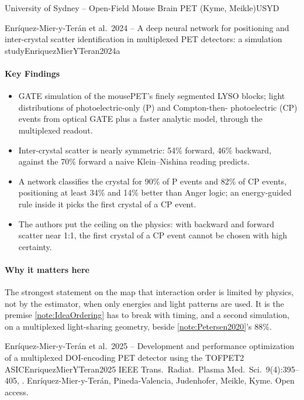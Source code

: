 \begin{programnote}{University of Sydney -- Open-Field Mouse Brain PET (Kyme, Meikle)}{USYD}
\begin{papernote}{Enríquez-Mier-y-Terán et al.\ 2024 -- A deep neural network for positioning and inter-crystal scatter identification in multiplexed PET detectors: a simulation study}{EnriquezMierYTeran2024a}
\paragraph{Key Findings}
\begin{itemize}
	\item GATE simulation of the mousePET's finely segmented LYSO blocks;
		light distributions of photoelectric-only (P) and Compton-then-
		photoelectric (CP) events from optical GATE plus a faster analytic
		model, through the multiplexed readout.
	\item Inter-crystal scatter is nearly symmetric: 54\% forward, 46\%
		backward, against the 70\% forward a naive Klein--Nishina reading
		predicts.
	\item A network classifies the crystal for 90\% of P events and 82\% of
		CP events, positioning at least 34\% and 14\% better than Anger logic;
		an energy-guided rule inside it picks the first crystal of a CP event.
	\item The authors put the ceiling on the physics: with backward and
		forward scatter near 1:1, the first crystal of a CP event cannot be
		chosen with high certainty.
\end{itemize}

\paragraph{Why it matters here}
The strongest statement on the map that interaction order is limited by
physics, not by the estimator, when only energies and light patterns are used.
It is the premise \ref{note:IdeaOrdering} has to break with timing, and a
second simulation, on a multiplexed light-sharing geometry, beside
\ref{note:Petersen2020}'s 88\%.
\end{papernote}

\begin{papernote}{Enríquez-Mier-y-Terán et al.\ 2025 -- Development and performance optimization of a multiplexed DOI-encoding PET detector using the TOFPET2 ASIC}{EnriquezMierYTeran2025}
IEEE Trans.\ Radiat.\ Plasma Med.\ Sci.\ 9(4):395--405,
. Enríquez-Mier-y-Terán, Pineda-Valencia,
Judenhofer, Meikle, Kyme. Open access.


\end{papernote}
\end{programnote}
